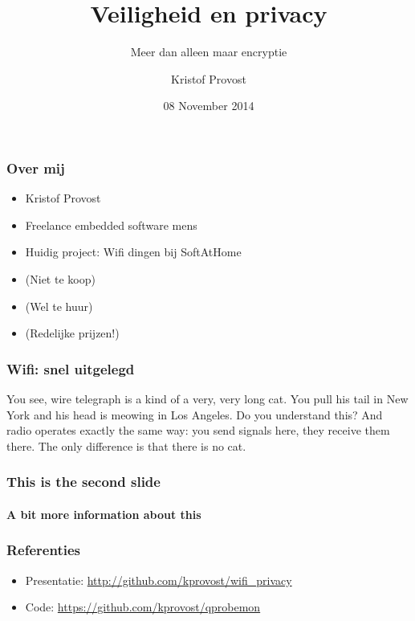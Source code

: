 \documentclass{beamer}
\title{Veiligheid en privacy}
\subtitle{Meer dan alleen maar encryptie}
\author{Kristof Provost}
\date{08 November 2014}
\begin{document}
  \frame{\titlepage}

  \begin{frame}
    \frametitle{Over mij}
    \begin{itemize}
      \item Kristof Provost
      \item Freelance embedded software mens
      \item Huidig project: Wifi dingen bij SoftAtHome
        \pause
      \item (Niet te koop)
        \pause
      \item (Wel te huur)
        \pause
      \item (Redelijke prijzen!)
    \end{itemize}
  \end{frame}

  \begin{frame}
    \frametitle{Wifi: snel uitgelegd}
    You see, wire telegraph is a kind of a very, very long cat.  You pull his
    tail in New York and his head is meowing in Los Angeles.  Do you understand
    this? And radio operates exactly the same way: you send signals here, they
    receive them there.  The only difference is that there is no cat.
  \end{frame}

  \begin{frame}
    \frametitle{This is the second slide}
    \framesubtitle{A bit more information about this}
  \end{frame}

  \begin{frame}
    \frametitle{Referenties}
    \begin{itemize}
        \item Presentatie: \url{http://github.com/kprovost/wifi_privacy}
        \item Code: \url{https://github.com/kprovost/qprobemon}
    \end{itemize}
  \end{frame}
\end{document}
